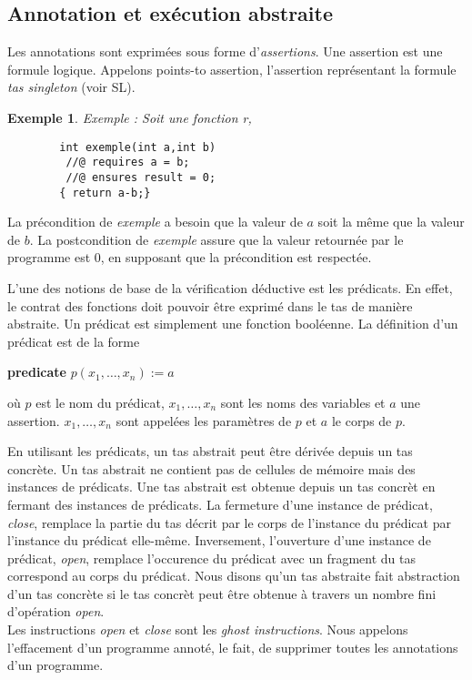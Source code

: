 \documentclass[11pt,openany]{article}
\newtheorem{exemple}{Exemple}
\begin{document}
	\subsection{Annotation et ex\'ecution abstraite}
		 Les annotations sont exprim\'ees sous forme d'\textit{assertions}. Une assertion est une formule logique. Appelons points-to assertion, l'assertion repr\'esentant la formule \textit{tas singleton} (voir SL).
		 
		\begin{exemple}
		Exemple : Soit une fonction r,
		\begin{lstlisting}
		int exemple(int a,int b)
		 //@ requires a = b;
		 //@ ensures result = 0;
		{ return a-b;}
		\end{lstlisting}
		\end{exemple}
		
	
		La pr\'econdition de \textit{exemple} a besoin que la valeur de $a$ soit la m\^eme que la valeur de $b$. La postcondition de \textit{exemple} assure que la valeur retourn\'ee par le programme est 0, en supposant que la pr\'econdition est respect\'ee.
				
	L'une des notions de base de la v\'erification d\'eductive est les pr\'edicats. En effet, le contrat des fonctions doit pouvoir \^etre exprim\'e dans le tas de mani\`ere abstraite. Un pr\'edicat est simplement une fonction bool\'eenne. La d\'efinition d'un pr\'edicat est de la forme
	\begin{center}
	
\textbf{predicate} $p(x_1,\ldots,x_n):=a$

	\end{center}
o\`u $p$ est le nom du pr\'edicat, $x_1,\ldots,x_n$ sont les noms des variables et $a$ une assertion. $x_1,\ldots,x_n$ sont appel\'ees les param\`etres de $p$ et $a$ le corps de $p$.

	En utilisant les pr\'edicats, un tas abstrait peut \^etre d\'eriv\'ee depuis un tas concr\`ete. Un tas abstrait ne contient pas de cellules de m\'emoire mais des instances de pr\'edicats. Une tas abstrait est obtenue depuis un tas concr\`et en fermant des instances de pr\'edicats. La fermeture d'une instance de pr\'edicat, \textit{close}, remplace la partie du tas d\'ecrit par le corps de l'instance du pr\'edicat par l'instance du pr\'edicat elle-m\^eme. Inversement, l'ouverture d'une instance de pr\'edicat, \textit{open}, remplace l'occurence du pr\'edicat avec un fragment du tas correspond au corps du pr\'edicat. Nous disons qu'un tas abstraite fait abstraction d'un tas concr\`ete si le tas concr\`et peut \^etre obtenue \`a travers un nombre fini d'op\'eration \textit{open}.\\ 
	Les instructions \textit{open} et \textit{close} sont les \textit{ghost instructions}. Nous appelons l'effacement d'un programme annot\'e, le fait, de supprimer toutes les annotations d'un programme.
	
\end{document}
